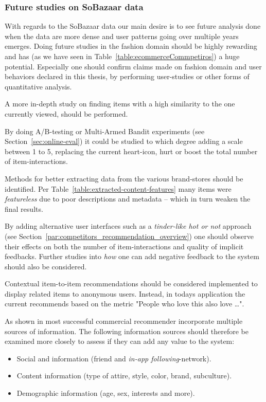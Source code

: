 \subsubsection{Future studies on SoBazaar data}

With regards to the SoBazaar data our main desire is to see future analysis
done when the data are more dense and user patterns going over multiple years
emerges. Doing future studies in the fashion domain should be highly rewarding
and has (as we have seen in Table~\ref{table:ecommerceCommpetiros}) a huge
potential. Especially one should confirm claims made on fashion domain and user
behaviors declared in this thesis, by performing user-studies or other forms
of quantitative analysis.

A more in-depth study on finding items with a high similarity to the one
currently viewed, should be performed.

By doing A/B-testing or Multi-Armed Bandit experiments (see
Section~\ref{sec:online-eval}) it could be studied to which degree adding a
scale between 1 to 5, replacing the current heart-icon, hurt or boost the total
number of item-interactions.

Methods for better extracting data from the various brand-stores should be
identified. Per Table~\ref{table:extracted-content-features} many items were
\textit{featureless} due to poor descriptions and metadata -- which in turn
weaken the final results.

By adding alternative user interfaces such as a \textit{tinder-like hot or not}
approach (see Section~\ref{par:competitors_recommendation_overview}) one should
observe their effects on both the number of item-interactions and quality of
implicit feedbacks. Further studies into \textit{how} one can add negative
feedback to the system should also be considered.

Contextual item-to-item recommendations should be considered implemented to
display related items to anonymous users. Instead, in todays application the
current recommends based on the metric "People who love this also love \dots".

As shown in \cite{meyer2012recommender} most successful commercial recommender
incorporate multiple sources of information. The following information sources
should therefore be examined more closely to assess if they can add any value
to the system:

\begin{itemize}
	\item Social and information (friend and \textit{in-app following}-network).
	\item Content information (type of attire, style, color, brand, subculture).
	\item Demographic information (age, sex, interests and more).
\end{itemize}


